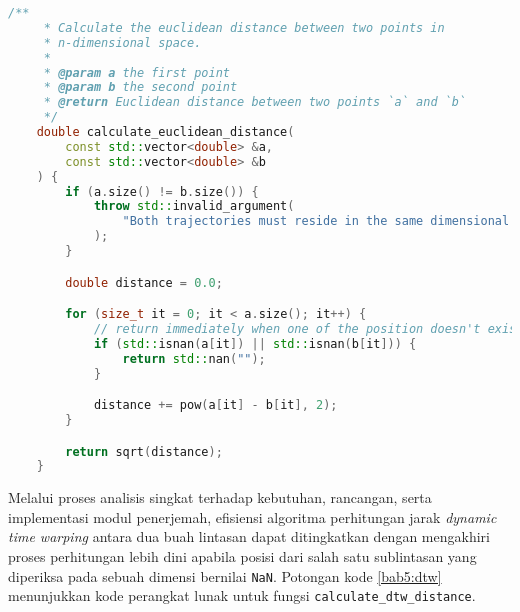 \begin{lstlisting}[language=C++, caption=Implementasi fungsi \texttt{calculate\_euclidean\_distance}, label={bab5:euclidean}]
    /**
     * Calculate the euclidean distance between two points in
     * n-dimensional space.
     * 
     * @param a the first point
     * @param b the second point
     * @return Euclidean distance between two points `a` and `b`
     */
    double calculate_euclidean_distance(
        const std::vector<double> &a,
        const std::vector<double> &b
    ) {
        if (a.size() != b.size()) {
            throw std::invalid_argument(
                "Both trajectories must reside in the same dimensional space."
            );
        }

        double distance = 0.0;

        for (size_t it = 0; it < a.size(); it++) {
            // return immediately when one of the position doesn't exist
            if (std::isnan(a[it]) || std::isnan(b[it])) {
                return std::nan("");
            }

            distance += pow(a[it] - b[it], 2);
        }

        return sqrt(distance);
    }
\end{lstlisting}

Melalui proses analisis singkat terhadap kebutuhan, rancangan, serta implementasi modul penerjemah, efisiensi algoritma perhitungan jarak \textit{dynamic time warping} antara dua buah lintasan dapat ditingkatkan dengan mengakhiri proses perhitungan lebih dini apabila posisi dari salah satu sublintasan yang diperiksa pada sebuah dimensi bernilai \texttt{NaN}. Potongan kode \ref{bab5:dtw} menunjukkan kode perangkat lunak untuk fungsi \texttt{calculate\_dtw\_distance}.

\clearpage

